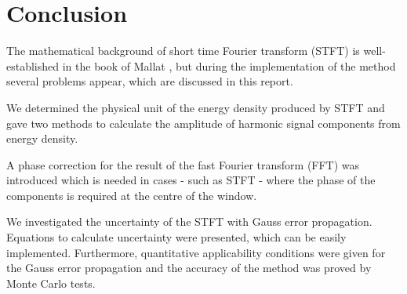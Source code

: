 \documentclass[a4paper,12pt,oneside]{article}
\begin{document}
\section{Conclusion}

The mathematical background of short time Fourier transform (STFT) is well-established in the book of Mallat \cite{mallat08wavelet}, but during the implementation of the method several problems appear, which are discussed in this report.

We determined the physical unit of the energy density produced by STFT and gave two methods to calculate the amplitude of harmonic signal components from energy density.

A phase correction for the result of the fast Fourier transform (FFT) was introduced which is needed in cases - such as STFT - where the phase of the components is required at the centre of the window.

We investigated the uncertainty of the STFT with Gauss error propagation. Equations to calculate uncertainty were presented, which can be easily implemented. Furthermore, quantitative applicability conditions were given for the Gauss error propagation and the accuracy of the method was proved by Monte Carlo tests.



\clearpage



\end{document}
